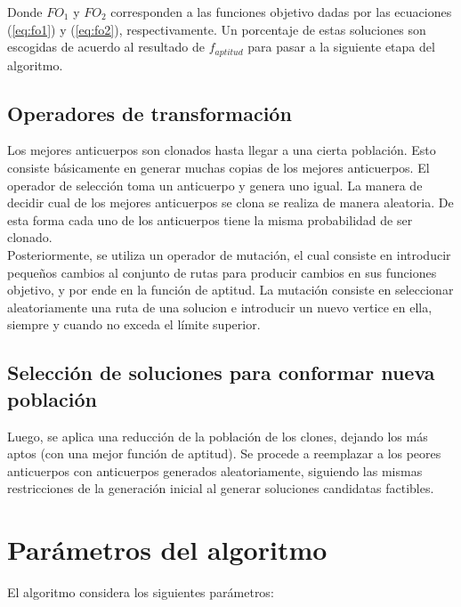 \documentclass{llncs}
\begin{document}
Donde $FO_1$ y $FO_2$ corresponden a las funciones objetivo dadas por las ecuaciones (\ref{eq:fo1}) y (\ref{eq:fo2}), respectivamente. Un porcentaje de estas soluciones son escogidas de acuerdo al resultado de $f_{aptitud}$ para pasar a la siguiente etapa del algoritmo.

\subsection{Operadores de transformación}

Los mejores anticuerpos son clonados hasta llegar a una cierta población. Esto consiste básicamente en generar muchas copias de los mejores anticuerpos. El operador de selección toma un anticuerpo y genera uno igual. La manera de decidir cual de los mejores anticuerpos se clona se realiza de manera aleatoria. De esta forma cada uno de los anticuerpos tiene la misma probabilidad de ser clonado.\\

Posteriormente, se utiliza un operador de mutación, el cual consiste en introducir pequeños cambios al conjunto de rutas para producir cambios en sus funciones objetivo, y por ende en la función de aptitud. La mutación consiste en seleccionar aleatoriamente una ruta de una solucion e introducir un nuevo vertice en ella, siempre y cuando no exceda el límite superior.


\subsection{Selección de soluciones para conformar nueva población}

Luego, se aplica una reducción de la población de los clones, dejando los más aptos (con una mejor función de aptitud). Se procede a reemplazar a los peores anticuerpos con anticuerpos generados aleatoriamente, siguiendo las mismas restricciones de la generación inicial al generar soluciones candidatas factibles. 

\section{Parámetros del algoritmo}

El algoritmo considera los siguientes parámetros:
\end{document}

